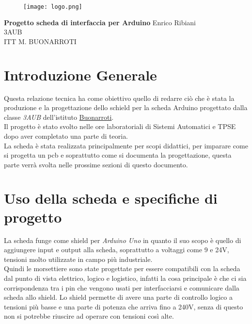 \documentclass[12pt]{article}
\begin{document}
    \begin{titlepage}
\begin{flushleft}
\begin{figure}[h]
    \centering
    \texttt{[image: logo.png]}
\end{figure}
\vspace{2\baselineskip}
\Huge{\textbf{Progetto scheda di interfaccia per Arduino}}
\vfill
\LARGE Enrico Ribiani\\
\LARGE 3AUB\\
\vfill
\huge{ITT M. BUONARROTI }

\end{flushleft}
\end{titlepage}
\pagestyle{fancy}
\fancyhead{}
\cfoot{\thepage}
\begin{titlepage}
\tableofcontents
\end{titlepage}

\vskip 3cm
\section{Introduzione Generale}
Questa relazione tecnica ha come obiettivo quello di redarre ciò che è stata la produzione e la progettazione dello schield per la scheda 
Arduino progettato dalla classe \textit{3AUB} dell'istituto \href{https://www.buonarroti.tn.it/}{Buonarroti}.\\
Il progetto è stato svolto nelle ore laboratoriali di Sistemi Automatici e TPSE dopo aver completato una parte di teoria.\\
La scheda è stata realizzata principalmente per scopi didattici, per imparare come si progetta un pcb e soprattutto come si documenta la progettazione, questa parte verrà svolta
nelle prossime sezioni di questo documento.\\
\section{Uso della scheda e specifiche di progetto}
La scheda funge come shield per \textit{Arduino Uno} in quanto il suo scopo è quello di aggiungere input e output alla scheda, soprattutto 
a voltaggi come 9 e 24V, tensioni molto utilizzate in campo più industriale.\\
Quindi le morsettiere sono state progettate per essere compatibili con la scheda dal punto di vista elettrico, logico e logistico, infatti la cosa principale è che 
ci sia corrispondenza tra i pin che vengono usati per interfacciarsi e comunicare dalla scheda allo shield.
Lo shield permette di avere una parte di controllo logico a tensioni più basse e una parte di potenza che arriva fino a 240V, senza di questo non si potrebbe riuscire ad operare con 
tensioni così alte.
\end{document}
